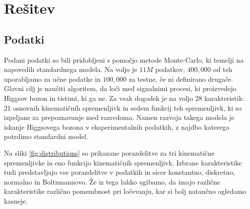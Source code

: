 \documentclass{article}
\begin{document}
\newpage
\section{Rešitev}
\subsection{Podatki}
Podani podatki so bili pridobljeni s pomočjo metode Monte-Carlo, ki temelji na napovedih standardnega modela. Na voljo je $11M$ podatkov, $400{,}000$ od teh uporabljamo za učne podatke in $100{,}000$ za testne, če ni definirano drugače. Glavni cilj je naučiti algoritem, da loči med signalnimi procesi, ki proizvedejo Higgsov bozon in tistimi, ki ga ne. Za vsak dogodek je na voljo 28 karakteristik: 21 osnovnih kinematičnih spremenljivk in sedem funkcij teh spremenljivk, ki so izpeljane za prepoznavanje med razredoma. Namen razvoja takega modela je iskanje Higgsovega bozona v eksperimentalnih podatkih, z najdbo katerega potrdimo standardni model.


Na sliki \ref{fig:distributions} so prikazane porazdelitve za tri kinematične spremenljivke in eno funkcijo kinematičnih spremenljivk. Izbrane karakteristike tudi predstavljajo vse porazdelitve v podatkih in sicer konstantno, diskretno, normalno in Boltzmannovo. Že iz tega lahko ugibamo, da imajo različne karakteristike različno pomembnost pri ločevanju, kar si bolj natančno ogledamo kasneje. 
\end{document}
